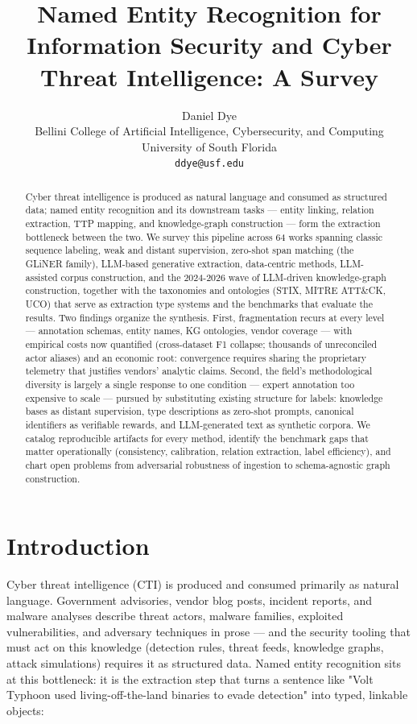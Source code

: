 \documentclass[11pt]{article}
\title{Named Entity Recognition for Information Security and Cyber Threat
Intelligence: A Survey}
\author{Daniel Dye \\
  Bellini College of Artificial Intelligence, Cybersecurity, and Computing \\
  University of South Florida \\
  \texttt{ddye@usf.edu}}
\begin{document}
\sloppy
\newcommand{\ent}[3]{\colorbox{#1}{\strut #2\,{\tiny\textsc{#3}}}}

\maketitle

\begin{abstract}

Cyber threat intelligence is produced as natural language and consumed as structured data; named entity recognition and its downstream tasks — entity linking, relation extraction, TTP mapping, and knowledge-graph construction — form the extraction bottleneck between the two. We survey this pipeline across 64 works spanning classic sequence labeling, weak and distant supervision, zero-shot span matching (the GLiNER family), LLM-based generative extraction, data-centric methods, LLM-assisted corpus construction, and the 2024-2026 wave of LLM-driven knowledge-graph construction, together with the taxonomies and ontologies (STIX, MITRE ATT\&CK, UCO) that serve as extraction type systems and the benchmarks that evaluate the results. Two findings organize the synthesis. First, fragmentation recurs at every level — annotation schemas, entity names, KG ontologies, vendor coverage — with empirical costs now quantified (cross-dataset F1 collapse; thousands of unreconciled actor aliases) and an economic root: convergence requires sharing the proprietary telemetry that justifies vendors' analytic claims. Second, the field's methodological diversity is largely a single response to one condition — expert annotation too expensive to scale — pursued by substituting existing structure for labels: knowledge bases as distant supervision, type descriptions as zero-shot prompts, canonical identifiers as verifiable rewards, and LLM-generated text as synthetic corpora. We catalog reproducible artifacts for every method, identify the benchmark gaps that matter operationally (consistency, calibration, relation extraction, label efficiency), and chart open problems from adversarial robustness of ingestion to schema-agnostic graph construction.

\end{abstract}
\section{Introduction}

Cyber threat intelligence (CTI) is produced and consumed primarily as natural language. Government advisories, vendor blog posts, incident reports, and malware analyses describe threat actors, malware families, exploited vulnerabilities, and adversary techniques in prose — and the security tooling that must act on this knowledge (detection rules, threat feeds, knowledge graphs, attack simulations) requires it as structured data. Named entity recognition sits at this bottleneck: it is the extraction step that turns a sentence like "Volt Typhoon used living-off-the-land binaries to evade detection" into typed, linkable objects:
\end{document}
